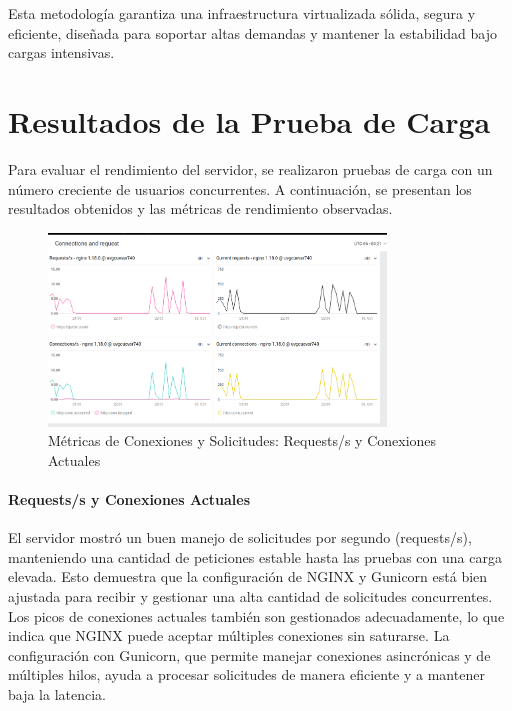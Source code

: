 Esta metodología garantiza una infraestructura virtualizada sólida, segura y eficiente, diseñada para soportar altas demandas y mantener la estabilidad bajo cargas intensivas.

\section{Resultados de la Prueba de Carga}

Para evaluar el rendimiento del servidor, se realizaron pruebas de carga con un número creciente de usuarios concurrentes. A continuación, se presentan los resultados obtenidos y las métricas de rendimiento observadas.

\begin{figure}[H]
    \centering
    \includegraphics[width=0.8\textwidth]{figuras/ConnectionsAndRequest.png}
    \caption{Métricas de Conexiones y Solicitudes: Requests/s y Conexiones Actuales}
    \label{fig:connectionsAndRequest}
\end{figure}

\paragraph{Requests/s y Conexiones Actuales}
El servidor mostró un buen manejo de solicitudes por segundo (requests/s), manteniendo una cantidad de peticiones estable hasta las pruebas con una carga elevada. Esto demuestra que la configuración de NGINX y Gunicorn está bien ajustada para recibir y gestionar una alta cantidad de solicitudes concurrentes. Los picos de conexiones actuales también son gestionados adecuadamente, lo que indica que NGINX puede aceptar múltiples conexiones sin saturarse. La configuración con Gunicorn, que permite manejar conexiones asincrónicas y de múltiples hilos, ayuda a procesar solicitudes de manera eficiente y a mantener baja la latencia.


